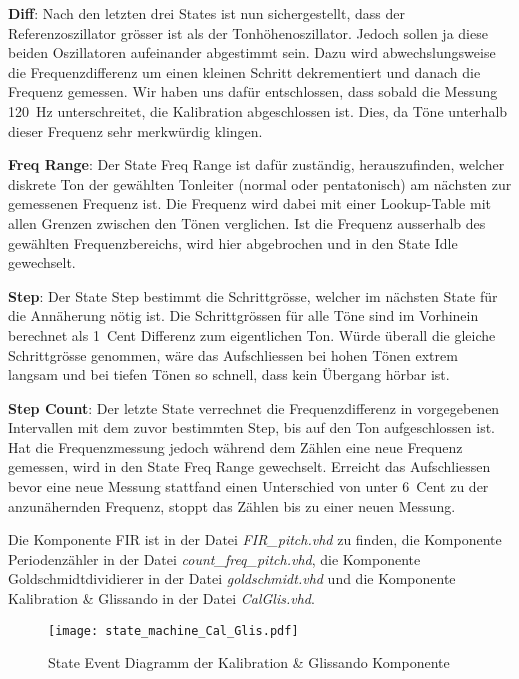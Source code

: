 \textbf{Diff}:
Nach den letzten drei States ist nun sichergestellt, dass der Referenzoszillator grösser ist als der Tonhöhenoszillator. Jedoch sollen ja diese beiden Oszillatoren aufeinander abgestimmt sein. Dazu wird abwechslungsweise die Frequenzdifferenz um einen kleinen Schritt dekrementiert und danach die Frequenz gemessen. Wir haben uns dafür entschlossen, dass sobald die Messung \SI{120}{Hz} unterschreitet, die Kalibration abgeschlossen ist. Dies, da Töne unterhalb dieser Frequenz sehr merkwürdig klingen.

\textbf{Freq Range}:
Der State Freq Range ist dafür zuständig, herauszufinden, welcher diskrete Ton der gewählten Tonleiter (normal oder pentatonisch) am nächsten zur gemessenen Frequenz ist. Die Frequenz wird dabei mit einer Lookup-Table mit allen Grenzen zwischen den Tönen verglichen. Ist die Frequenz ausserhalb des gewählten Frequenzbereichs, wird hier abgebrochen und in den State Idle gewechselt.

\textbf{Step}:
Der State Step bestimmt die Schrittgrösse, welcher im nächsten State für die Annäherung nötig ist. Die Schrittgrössen für alle Töne sind im Vorhinein berechnet als \SI{1}{Cent} Differenz zum eigentlichen Ton. Würde überall die gleiche Schrittgrösse genommen, wäre das Aufschliessen bei hohen Tönen extrem langsam und bei tiefen Tönen so schnell, dass kein Übergang hörbar ist. 

\textbf{Step Count}:
Der letzte State verrechnet die Frequenzdifferenz in vorgegebenen Intervallen mit dem zuvor bestimmten Step, bis auf den Ton aufgeschlossen ist. Hat die Frequenzmessung jedoch während dem Zählen eine neue Frequenz gemessen, wird in den State Freq Range gewechselt. Erreicht das Aufschliessen bevor eine neue Messung stattfand einen Unterschied von unter \SI{6}{Cent} zu der anzunähernden Frequenz, stoppt das Zählen bis zu einer neuen Messung.


Die Komponente FIR ist in der Datei \textit{FIR\_pitch.vhd} zu finden, die Komponente Periodenzähler in der Datei \textit{count\_freq\_pitch.vhd}, die Komponente Goldschmidtdividierer in der Datei \textit{goldschmidt.vhd} und die Komponente Kalibration \& Glissando in der Datei \textit{CalGlis.vhd}.

\begin{figure}[h!]
	\centering
	\texttt{[image: state\_machine\_Cal\_Glis.pdf]}
	\caption{State Event Diagramm der Kalibration \& Glissando Komponente} 
	\label{img:state_event_Cal_Glis}
\end{figure} 

